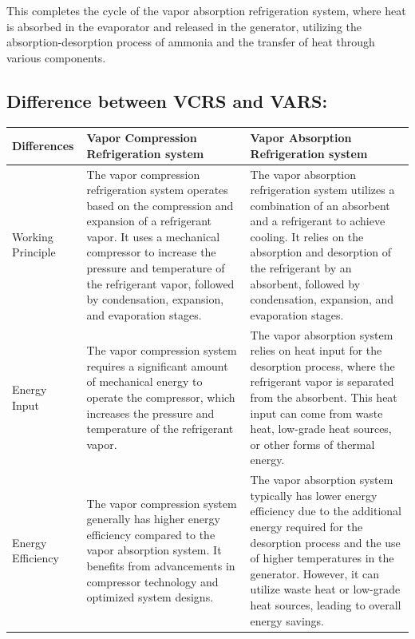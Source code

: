 \documentclass{article}
\begin{document}
This completes the cycle of the vapor absorption refrigeration system, where heat is absorbed in the evaporator and released in the generator, utilizing the absorption-desorption process of ammonia and the transfer of heat through various components.

\pagebreak


\subsection*{Difference between VCRS and VARS:}

\begin{table}[!htbp]
  \centering
  \begin{tabularx}{\linewidth}{@{}>{\hsize=0.6\hsize}X *{2}{>{\hsize=1.2\hsize}X}@{}}
    \hline
    \textbf{Differences} & \textbf{Vapor Compression Refrigeration system} & \textbf{Vapor Absorption Refrigeration system} \\
    \hline
    Working Principle & The vapor compression refrigeration system operates based on the compression and expansion of a refrigerant vapor. It uses a mechanical compressor to increase the pressure and temperature of the refrigerant vapor, followed by condensation, expansion, and evaporation stages. & The vapor absorption refrigeration system utilizes a combination of an absorbent and a refrigerant to achieve cooling. It relies on the absorption and desorption of the refrigerant by an absorbent, followed by condensation, expansion, and evaporation stages. \\
    \hline 
    Energy Input & The vapor compression system requires a significant amount of mechanical energy to operate the compressor, which increases the pressure and temperature of the refrigerant vapor. & The vapor absorption system relies on heat input for the desorption process, where the refrigerant vapor is separated from the absorbent. This heat input can come from waste heat, low-grade heat sources, or other forms of thermal energy.\\
    \hline 
    Energy Efficiency & The vapor compression system generally has higher energy efficiency compared to the vapor absorption system. It benefits from advancements in compressor technology and optimized system designs. & The vapor absorption system typically has lower energy efficiency due to the additional energy required for the desorption process and the use of higher temperatures in the generator. However, it can utilize waste heat or low-grade heat sources, leading to overall energy savings. \\

\end{tabularx}
\end{table}
\end{document}
